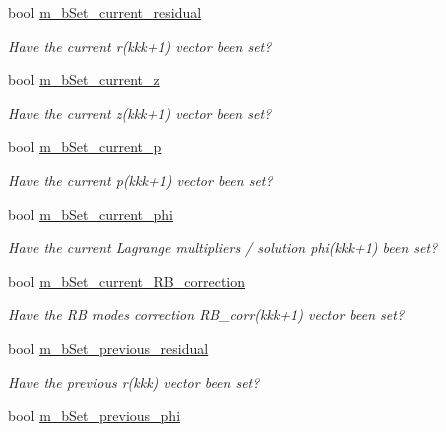 \begin{DoxyCompactItemize}
bool \hyperlink{classcarl_1_1_f_e_t_i___operations_a1f1f890054d63bdf25937e6bf66fa5ce}{m\+\_\+b\+Set\+\_\+current\+\_\+residual}
\begin{DoxyCompactList}\small\item\em Have the current {\ttfamily r(kkk+1)} vector been set? \end{DoxyCompactList}\item 
bool \hyperlink{classcarl_1_1_f_e_t_i___operations_a979d0cf4b56999fcd126825b60ec192f}{m\+\_\+b\+Set\+\_\+current\+\_\+z}
\begin{DoxyCompactList}\small\item\em Have the current {\ttfamily z(kkk+1)} vector been set? \end{DoxyCompactList}\item 
bool \hyperlink{classcarl_1_1_f_e_t_i___operations_ae72a5d292fd78d8ca56039d822d5078c}{m\+\_\+b\+Set\+\_\+current\+\_\+p}
\begin{DoxyCompactList}\small\item\em Have the current {\ttfamily p(kkk+1)} vector been set? \end{DoxyCompactList}\item 
bool \hyperlink{classcarl_1_1_f_e_t_i___operations_af9131d1125ae99d73932d11ee5c4c7b7}{m\+\_\+b\+Set\+\_\+current\+\_\+phi}
\begin{DoxyCompactList}\small\item\em Have the current Lagrange multipliers / solution {\ttfamily phi(kkk+1)} been set? \end{DoxyCompactList}\item 
bool \hyperlink{classcarl_1_1_f_e_t_i___operations_a4ba412e4dc2d64b62ebcf81773ed5ce8}{m\+\_\+b\+Set\+\_\+current\+\_\+\+R\+B\+\_\+correction}
\begin{DoxyCompactList}\small\item\em Have the R\+B modes correction {\ttfamily R\+B\+\_\+corr(kkk+1)} vector been set? \end{DoxyCompactList}\item 
bool \hyperlink{classcarl_1_1_f_e_t_i___operations_a2368fc7147e38fa780d89e0b2c676d5d}{m\+\_\+b\+Set\+\_\+previous\+\_\+residual}
\begin{DoxyCompactList}\small\item\em Have the previous {\ttfamily r(kkk)} vector been set? \end{DoxyCompactList}\item 
bool \hyperlink{classcarl_1_1_f_e_t_i___operations_a76ef85eba8cceba4cfc8bc167d8dd73f}{m\+\_\+b\+Set\+\_\+previous\+\_\+phi}

\end{DoxyCompactItemize}
